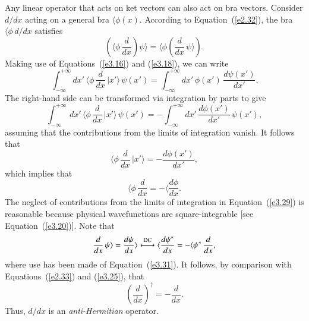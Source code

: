 Any linear operator that acts on ket vectors can also act on bra vectors. 
Consider $d/dx$ acting on a general bra $\langle \phi(x)$. According to
Equation~(\ref{e2.32}), the bra $\langle \phi \,d/dx$ satisfies
\begin{equation}
\left( \langle \phi \,\frac{d}{dx} \right) \psi\rangle = \langle \phi\left(
\frac{d}{dx}\,\psi\rangle\right).
\end{equation}
Making use of Equations~(\ref{e3.16}) and (\ref{e3.18}), we can write
\begin{equation}
\int_{-\infty}^{+\infty}dx' \,\langle \phi \,\frac{d}{dx}\, |x'\rangle
\, \psi(x') = \int_{-\infty}^{+\infty} dx'\,\phi(x')\,  \frac{d\psi(x')}{dx'}.
\end{equation}
The right-hand side can be transformed via integration by parts to give
\begin{equation}\label{e3.29}
\int_{-\infty}^{+\infty} \,dx' \,\langle \phi\, \frac{d}{dx}\, |x'\rangle
\,\psi(x') = -\int_{-\infty}^{+\infty}dx' \, \frac{d \phi(x')}{dx'}\,  \psi(x'),
\end{equation}
assuming that the contributions from the limits of integration vanish. 
It follows that
\begin{equation}
\langle \phi\, \frac{d}{dx}\, | x'\rangle = - \frac{d \phi(x')}{dx'},
\end{equation}
which implies that 
\begin{equation}\label{e3.31}
\langle \phi\, \frac{d}{dx} = - \langle \frac{d\phi}{dx}.
\end{equation}
The neglect of contributions from the limits of integration in Equation~(\ref{e3.29}) is
reasonable because
 physical wavefunctions are square-integrable [see Equation~(\ref{e3.20})].
Note that
\begin{equation}
\frac{d}{dx}\, \psi\rangle = \frac{d\psi}{dx}\rangle \stackrel{\rm DC}{\longleftrightarrow}
\langle \frac{d\psi^\ast}{dx} = -\langle \psi^\ast \,\frac{d}{dx},
\end{equation}
where use has been made of Equation~(\ref{e3.31}). 
It follows, by comparison with Equations~(\ref{e2.33}) and (\ref{e3.25}), that
\begin{equation}\label{e3.33}
\left(\frac{d}{dx}\right)^{\dag }= - \frac{d}{dx}.
\end{equation}
Thus, $d/dx$ is an {\em anti-Hermitian}\/  operator. 

